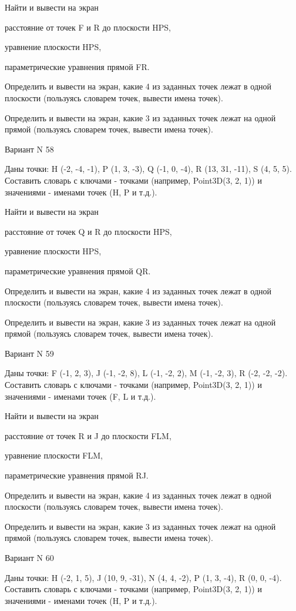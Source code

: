 \documentclass[11pt]{report}
\begin{document}
 
Найти и вывести на экран


расстояние от точек F и R до плоскости HPS,

 
уравнение плоскости HPS,

 
параметрические уравнения прямой FR.


Определить и вывести на экран, какие 4 из заданных точек лежат в одной плоскости (пользуясь словарем точек, вывести имена точек).


Определить и вывести на экран, какие 3 из заданных точек лежат на одной прямой (пользуясь словарем точек, вывести имена точек).

Вариант N 58

Даны точки: H (-2, -4, -1), P (1, 3, -3), Q (-1, 0, -4), R (13, 31, -11), S (4, 5, 5).
Составить словарь с ключами - точками (например, Point3D(3, 2, 1)) и значениями - именами точек (H, P и т.д.).

 
Найти и вывести на экран


расстояние от точек Q и R до плоскости HPS,

 
уравнение плоскости HPS,

 
параметрические уравнения прямой QR.


Определить и вывести на экран, какие 4 из заданных точек лежат в одной плоскости (пользуясь словарем точек, вывести имена точек).


Определить и вывести на экран, какие 3 из заданных точек лежат на одной прямой (пользуясь словарем точек, вывести имена точек).

Вариант N 59

Даны точки: F (-1, 2, 3), J (-1, -2, 8), L (-1, -2, 2), M (-1, -2, 3), R (-2, -2, -2).
Составить словарь с ключами - точками (например, Point3D(3, 2, 1)) и значениями - именами точек (F, L и т.д.).

 
Найти и вывести на экран


расстояние от точек R и J до плоскости FLM,

 
уравнение плоскости FLM,

 
параметрические уравнения прямой RJ.


Определить и вывести на экран, какие 4 из заданных точек лежат в одной плоскости (пользуясь словарем точек, вывести имена точек).


Определить и вывести на экран, какие 3 из заданных точек лежат на одной прямой (пользуясь словарем точек, вывести имена точек).

Вариант N 60

Даны точки: H (-2, 1, 5), J (10, 9, -31), N (4, 4, -2), P (1, 3, -4), R (0, 0, -4).
Составить словарь с ключами - точками (например, Point3D(3, 2, 1)) и значениями - именами точек (H, P и т.д.).
\end{document}
